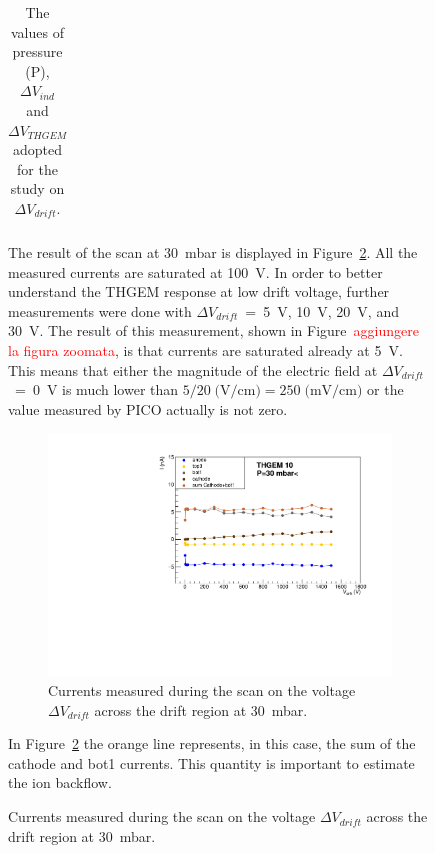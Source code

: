 \documentclass[a4paper, 11 pt]{article}
\newcommand{\Vind}{$\Delta V_{ind}$}
\newcommand{\Vthgem}{$\Delta V_{THGEM}$}
\newcommand{\Vdrift}{$ \Delta V_{drift}$}
\begin{document}
\begin{figure}[htbp]
\begin{table} [!h]
\begin{center}
\begin{tabular} {ccccc}
			\bottomrule[0.1em]
		\end{tabular}
	\end{center}
	\caption{The values of pressure (P), \Vind{} and \Vthgem{} adopted for the study on \Vdrift.} \label{tab:FULLTHGEM_vdrift}
\end{table}

The result of the scan at 30~mbar is displayed in Figure~\ref{fig:drift_FULLTHGEM_30mbar}. 
All the measured currents are saturated at 100~V.
In order to better understand the THGEM response at low drift voltage, further measurements were done with \Vdrift~=~5~V, 10~V, 20~V, and 30~V.
The result of this measurement, shown in Figure~\textcolor{red}{aggiungere la figura zoomata}, is that currents are saturated already at 5~V.
This means that either the magnitude of the electric field at \Vdrift~=~0~V is much lower than $5/20\; \mbox{(V/cm)}= 250 \; \mbox{(mV/cm)}$ or the value measured by PICO actually is not zero.
\begin{figure}[htbp]
	\centering
	\includegraphics[width=\textwidth]{Immagini/driftScan_THGEM10_30mbar.pdf}
	\caption{Currents measured during the scan on the voltage \Vdrift{} across the drift region at 30~mbar.}
	\label{fig:drift_FULLTHGEM_30mbar}
\end{figure}

In Figure~\ref{fig:drift_FULLTHGEM_30mbar} the orange line represents, in this case, the sum of the cathode and bot1 currents.
This quantity is important to estimate the ion backflow. 




\end{figure}
\end{document}
